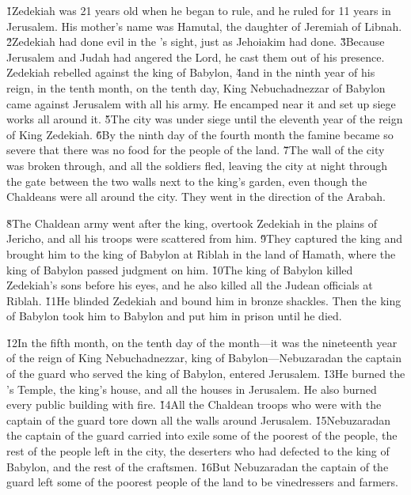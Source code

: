 \v{1}Zedekiah was 21 years old when he began to rule, and he ruled for 11 years in Jerusalem. His mother's name was Hamutal, the daughter of Jeremiah of Libnah. \v{2}Zedekiah had done evil in the 's sight, just as Jehoiakim had done. \v{3}Because Jerusalem and Judah had angered the Lord, he cast them out of his presence. Zedekiah rebelled against the king of Babylon, \v{4}and in the ninth year of his reign, in the tenth month, on the tenth day, King Nebuchadnezzar of Babylon came against Jerusalem with all his army. He encamped near it and set up siege works all around it. \v{5}The city was under siege until the eleventh year of the reign of King Zedekiah. \v{6}By the ninth day of the fourth month the famine became so severe that there was no food for the people of the land. \v{7}The wall of the city was broken through, and all the soldiers fled, leaving the city at night through the gate between the two walls next to the king's garden, even though the Chaldeans were all around the city. They went in the direction of the Arabah.

\v{8}The Chaldean army went after the king, overtook Zedekiah in the plains of Jericho, and all his troops were scattered from him. \v{9}They captured the king and brought him to the king of Babylon at Riblah in the land of Hamath, where the king of Babylon passed judgment on him. \v{10}The king of Babylon killed Zedekiah's sons before his eyes, and he also killed all the Judean officials at Riblah. \v{11}He blinded Zedekiah and bound him in bronze shackles. Then the king of Babylon took him to Babylon and put him in prison until he died.

\v{12}In the fifth month, on the tenth day of the month---it was the nineteenth year of the reign of King Nebuchadnezzar, king of Babylon---Nebuzaradan the captain of the guard who served the king of Babylon, entered Jerusalem. \v{13}He burned the 's Temple, the king's house, and all the houses in Jerusalem. He also burned every public building with fire. \v{14}All the Chaldean troops who were with the captain of the guard tore down all the walls around Jerusalem. \v{15}Nebuzaradan the captain of the guard carried into exile some of the poorest of the people, the rest of the people left in the city, the deserters who had defected to the king of Babylon, and the rest of the craftsmen. \v{16}But Nebuzaradan the captain of the guard left some of the poorest people of the land to be vinedressers and farmers.

